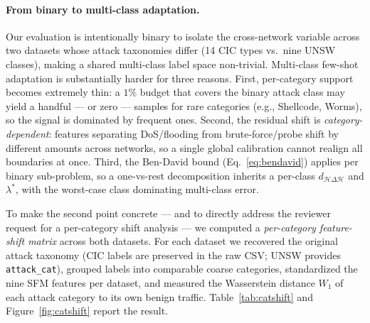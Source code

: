 \documentclass[preprint,12pt,authoryear]{elsarticle}
\begin{document}
\paragraph{From binary to multi-class adaptation.} Our evaluation is intentionally
binary to isolate the cross-network variable across two datasets whose attack
taxonomies differ (14 CIC types vs.\ nine UNSW classes), making a shared multi-class
label space non-trivial. Multi-class few-shot adaptation is substantially harder for
three reasons. First, per-category support becomes extremely thin: a $1\%$ budget
that covers the binary attack class may yield a handful --- or zero --- samples for
rare categories (e.g., Shellcode, Worms), so the signal is dominated by frequent
ones. Second, the residual shift is \emph{category-dependent}: features separating
DoS/flooding from brute-force/probe shift by different amounts across networks, so a
single global calibration cannot realign all boundaries at once. Third, the
Ben-David bound (Eq.~\eqref{eq:bendavid}) applies per binary sub-problem, so a
one-vs-rest decomposition inherits a per-class $d_{\mathcal{H}\Delta\mathcal{H}}$ and
$\lambda^\ast$, with the worst-case class dominating multi-class error.

To make the second point concrete --- and to directly address the reviewer
request for a per-category shift analysis --- we computed a
\emph{per-category feature-shift matrix} across both datasets. For each dataset we
recovered the original attack taxonomy (CIC labels are preserved in the raw CSV;
UNSW provides \texttt{attack\_cat}), grouped labels into comparable coarse
categories, standardized the nine SFM features per dataset, and measured the
Wasserstein distance $W_1$ of each attack category to its own benign traffic.
Table~\ref{tab:catshift} and Figure~\ref{fig:catshift} report the result.
\end{document}
